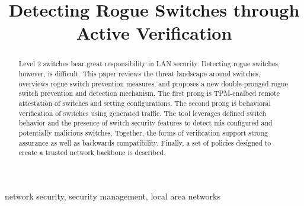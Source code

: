 \documentclass[journal]{IEEEtran}
\begin{document}
\title{Detecting Rogue Switches through Active Verification}

\author{
}

\maketitle



\begin{abstract}
Level 2 switches bear great responsibility in LAN security. Detecting rogue switches, however, is
difficult. This paper reviews the threat landscape around switches, overviews rogue switch
prevention measures, and proposes a new double-pronged rogue switch prevention and detection
mechanism. The first prong is TPM-enalbed remote attestation of switches and setting configurations.
The second prong is behavioral verification of switches using generated traffic. The tool leverages
defined switch behavior and the presence of switch security features to detect mis-configured and
potentially malicious switches. Together, the forms of verification support strong assurance as well
as backwards compatibility. Finally, a set of policies designed to create a trusted network backbone
is described.

\iffalse
Switches have several built-in security features. Most are of the pattern (1) create rule for a
protocol (2) snoop traffic of that protocol (3) drop packets that violate the rule. Examples are
DHCP snooping, dynamic ARP inspection, and MAC limiting. This paper proposes an automated switch
configuration verification tool. This tool would test switches against the defined policies to
ensure that they are properly configured. The test method will be generated traffic specifically
designed to validate a given policy. Depending on the tool mode, this method can detect innocent
errors as well as malicious or rogue switches. Three modes of tool setup of varying convenience and
detection capabilities are investigated: test-bench mode, deployed client-server mode, and deployed
server-only mode.
\fi
\end{abstract}

\begin{IEEEkeywords}
network security, security management, local area networks
\end{IEEEkeywords}
\end{document}
